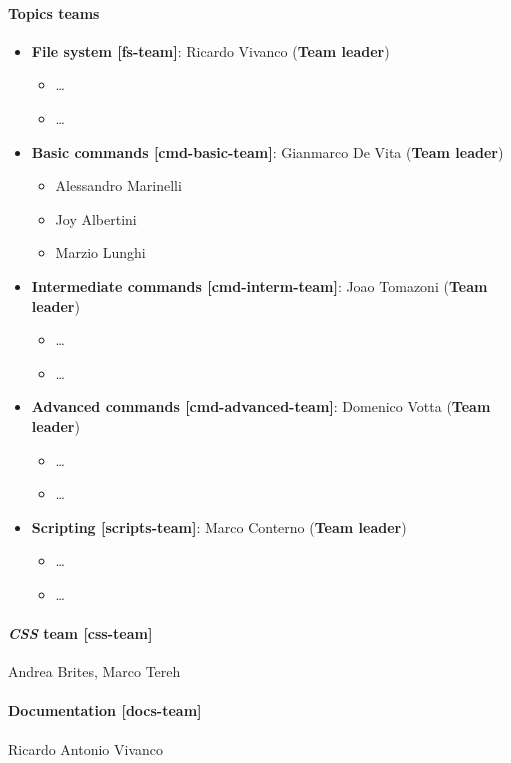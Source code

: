 \documentclass[hidelinks,12pt,a4paper,numbers=enddot]{scrartcl}
\begin{document}
\paragraph{Topics teams}
\begin{itemize}
    \item \textbf{File system {[}fs-team{]}}: Ricardo Vivanco (\textbf{Team leader})
      \begin{itemize}
      \item \ldots
      \item \ldots
      \end{itemize}
    \item \textbf{Basic commands {[}cmd-basic-team{]}}: Gianmarco De Vita (\textbf{Team leader})
      \begin{itemize}
        \item Alessandro Marinelli
        \item Joy Albertini
        \item Marzio Lunghi
      \end{itemize}
    \item \textbf{Intermediate commands {[}cmd-interm-team{]}}: Joao Tomazoni (\textbf{Team leader})
      \begin{itemize}
        \item \ldots
        \item \ldots
      \end{itemize}
    \item \textbf{Advanced commands {[}cmd-advanced-team{]}}: Domenico Votta (\textbf{Team leader})
      \begin{itemize}
        \item \ldots
        \item \ldots
      \end{itemize}
    \item \textbf{Scripting {[}scripts-team{]}}: Marco Conterno (\textbf{Team leader})
      \begin{itemize}
      \item \ldots
      \item \ldots
      \end{itemize}
\end{itemize}

\paragraph{\emph{CSS} team {[}css-team{]}}
Andrea Brites, Marco Tereh

\paragraph{Documentation {[}docs-team{]}}
Ricardo Antonio Vivanco
\end{document}
